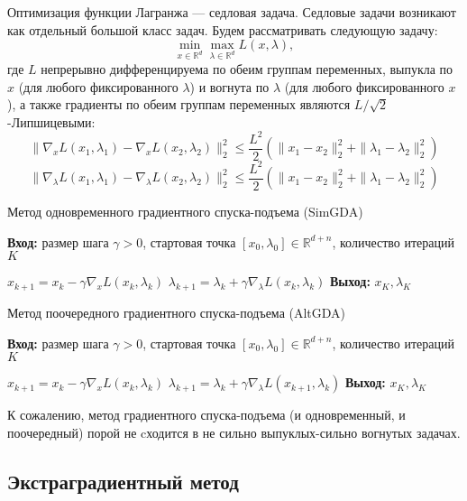 Оптимизация функции Лагранжа — седловая задача. Седловые задачи возникают как отдельный большой класс задач. Будем рассматривать следующую задачу:
$$\min_{x \in \mathbb{R}^d} \max_{\lambda \in \mathbb{R}^d} L(x, \lambda),$$
где $L$ непрерывно дифференцируема по обеим группам переменных, выпукла по $x$ (для любого фиксированного $\lambda$) и вогнута по $\lambda$ (для любого фиксированного $x$), а также градиенты по обеим группам переменных являются $L/\sqrt{2}$-Липшицевыми:
$$\| \nabla_x L(x_1, \lambda_1) - \nabla_x L(x_2, \lambda_2) \|_2^2 \leq \frac{L^2}{2} \left( \| x_1 - x_2 \|_2^2 + \| \lambda_1 - \lambda_2 \|_2^2 \right)$$
$$\| \nabla_\lambda L(x_1, \lambda_1) - \nabla_\lambda L(x_2, \lambda_2) \|_2^2 \leq \frac{L^2}{2} \left( \| x_1 - x_2 \|_2^2 + \| \lambda_1 - \lambda_2 \|_2^2 \right)$$

\begin{algorithm}[H]
    \caption{Метод одновременного градиентного спуска-подъема (SimGDA)}
    \textbf{Вход:} размер шага $\gamma > 0$, стартовая точка $[x_0, \lambda_0] \in \mathbb{R}^{d+n}$, количество итераций $K$
    \begin{algorithmic}[1]
        \State $x_{k+1} = x_k - \gamma \nabla_x L(x_k, \lambda_k)$
        \State $\lambda_{k+1} = \lambda_k + \gamma \nabla_\lambda L(x_k, \lambda_k)$
        \EndFor
        \State \textbf{Выход:} $x_K, \lambda_K$
    \end{algorithmic}
\end{algorithm}

\begin{algorithm}[H]
    \caption{Метод поочередного градиентного спуска-подъема (AltGDA)}
    \textbf{Вход:} размер шага $\gamma > 0$, стартовая точка $[x_0, \lambda_0] \in \mathbb{R}^{d+n}$, количество итераций $K$
    \begin{algorithmic}[1]
        \State $x_{k+1} = x_k - \gamma \nabla_x L(x_k, \lambda_k)$
        \State $\lambda_{k+1} = \lambda_k + \gamma \nabla_\lambda L(x_{k+1}, \lambda_k)$
        \EndFor
        \State \textbf{Выход:} $x_K, \lambda_K$
    \end{algorithmic}
\end{algorithm}

К сожалению, метод градиентного спуска-подъема (и одновременный, и поочередный) порой не cходится в не сильно выпуклых-сильно
вогнутых задачах.

\subsection*{Экстраградиентный метод}

